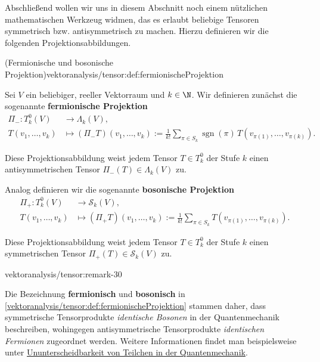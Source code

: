 \documentclass[letterpaper,10pt,english]{jupyterBook}
\begin{document}
\par
Abschließend wollen wir uns in diesem Abschnitt noch einem nützlichen mathematischen Werkzeug widmen, das es erlaubt beliebige Tensoren symmetrisch bzw. antisymmetrisch zu machen.
Hierzu definieren wir die folgenden Projektionsabbildungen.
\begin{definition}{(Fermionische und bosonische Projektion)}{vektoranalysis/tensor:def:fermionischeProjektion}



\par
Sei \(V\) ein beliebiger, reeller Vektorraum und \(k \in \N\).
Wir definieren zunächst die sogenannte \textbf{fermionische Projektion}
\begin{align*}
\Pi_- \colon T_k^0(V) &\rightarrow \Lambda_k(V), \\
T(v_1, \ldots, v_k) &\mapsto (\Pi_- T)(v_1, \ldots, v_k) := \frac{1}{k!} \sum_{\pi \in S_k} \operatorname{sgn}(\pi) \, T(v_{\pi(1)}, \ldots, v_{\pi(k)}).
\end{align*}
\par
Diese Projektionsabbildung weist jedem Tensor \(T\in T_k^0\) der Stufe \(k\) einen antisymmetrischen Tensor \(\Pi_-(T) \in \Lambda_k(V)\) zu.

\par
Analog definieren wir die sogenannte \textbf{bosonische Projektion}
\begin{align*}
\Pi_+ \colon T_k^0(V) &\rightarrow \mathcal{S}_k(V), \\
T(v_1, \ldots, v_k) &\mapsto (\Pi_+ T)(v_1, \ldots, v_k) := \frac{1}{k!} \sum_{\pi \in S_k} T(v_{\pi(1)}, \ldots, v_{\pi(k)}).
\end{align*}
\par
Diese Projektionsabbildung weist jedem Tensor \(T\in T_k^0\) der Stufe \(k\) einen symmetrischen Tensor \(\Pi_+(T) \in \mathcal{S}_k(V)\) zu.
\end{definition}
\begin{remark}{}{vektoranalysis/tensor:remark-30}



\par
Die Bezeichnung \textbf{fermionisch} und \textbf{bosonisch} in \cref{vektoranalysis/tensor:def:fermionischeProjektion} stammen daher, dass symmetrische Tensorprodukte \emph{identische Bosonen} in der Quantenmechanik beschreiben, wohingegen antisymmetrische Tensorprodukte \emph{identischen Fermionen} zugeordnet werden. Weitere Informationen findet man beispielsweise unter \href{https://de.wikipedia.org/wiki/Ununterscheidbare\_Teilchen\#Ununterscheidbarkeit\_in\_der\_Quantenmechanik}{Ununterscheidbarkeit von Teilchen in der Quantenmechanik}.
\end{remark}
\end{document}
